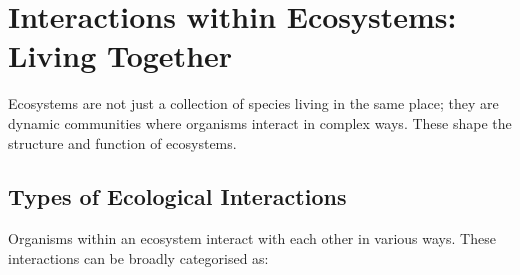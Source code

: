 \section{Interactions within Ecosystems: Living Together}

Ecosystems are not just a collection of species living in the same place; they are dynamic communities where organisms interact in complex ways. These  shape the structure and function of ecosystems.

\subsection{Types of Ecological Interactions}

Organisms within an ecosystem interact with each other in various ways. These interactions can be broadly categorised as:

